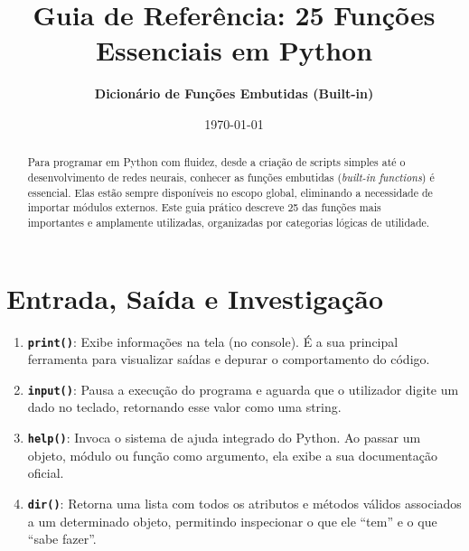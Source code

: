 \documentclass[11pt,a4paper]{article}
\title{\textbf{\color{primarycolor}Guia de Referência: 25 Funções Essenciais em Python}}
\author{\textbf{Dicionário de Funções Embutidas (Built-in)}}
\date{\today}
\begin{document}
\maketitle

\begin{abstract}
Para programar em Python com fluidez, desde a criação de scripts simples até o desenvolvimento de redes neurais, conhecer as funções embutidas (\textit{built-in functions}) é essencial. Elas estão sempre disponíveis no escopo global, eliminando a necessidade de importar módulos externos. Este guia prático descreve 25 das funções mais importantes e amplamente utilizadas, organizadas por categorias lógicas de utilidade.
\end{abstract}

\vspace{0.5cm}

\section{Entrada, Saída e Investigação}
\begin{enumerate}[label=\arabic*., leftmargin=*]
    \item \textbf{\texttt{print()}}: Exibe informações na tela (no console). É a sua principal ferramenta para visualizar saídas e depurar o comportamento do código.
    \item \textbf{\texttt{input()}}: Pausa a execução do programa e aguarda que o utilizador digite um dado no teclado, retornando esse valor como uma string.
    \item \textbf{\texttt{help()}}: Invoca o sistema de ajuda integrado do Python. Ao passar um objeto, módulo ou função como argumento, ela exibe a sua documentação oficial.
    \item \textbf{\texttt{dir()}}: Retorna uma lista com todos os atributos e métodos válidos associados a um determinado objeto, permitindo inspecionar o que ele ``tem'' e o que ``sabe fazer''.
\end{enumerate}
\end{document}
